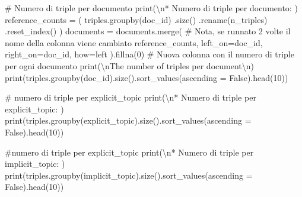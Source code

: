 \documentclass[
  italian,
  a4paper,
]{article}
\newenvironment{Shaded}{\begin{snugshade}}{\end{snugshade}}
\newcommand{\BuiltInTok}[1]{\textcolor[rgb]{0.00,0.23,0.31}{#1}}
\newcommand{\CharTok}[1]{\textcolor[rgb]{0.13,0.47,0.30}{#1}}
\newcommand{\CommentTok}[1]{\textcolor[rgb]{0.37,0.37,0.37}{#1}}
\newcommand{\DecValTok}[1]{\textcolor[rgb]{0.68,0.00,0.00}{#1}}
\newcommand{\NormalTok}[1]{\textcolor[rgb]{0.00,0.23,0.31}{#1}}
\newcommand{\OperatorTok}[1]{\textcolor[rgb]{0.37,0.37,0.37}{#1}}
\newcommand{\StringTok}[1]{\textcolor[rgb]{0.13,0.47,0.30}{#1}}
\newcommand{\VariableTok}[1]{\textcolor[rgb]{0.07,0.07,0.07}{#1}}
\begin{document}
\begin{Shaded}
\begin{Highlighting}[]
\CommentTok{\# Numero di triple per documento }
\BuiltInTok{print}\NormalTok{(}\StringTok{\textquotesingle{}}\CharTok{\textbackslash{}n}\StringTok{* Numero di triple per documento: \textquotesingle{}}\NormalTok{)}
\NormalTok{reference\_counts }\OperatorTok{=}\NormalTok{ (}
\NormalTok{    triples.groupby(}\StringTok{\textquotesingle{}doc\_id\textquotesingle{}}\NormalTok{)}
\NormalTok{      .size()}
\NormalTok{      .rename(}\StringTok{\textquotesingle{}n\_triples\textquotesingle{}}\NormalTok{)}
\NormalTok{      .reset\_index()}
\NormalTok{)}
\NormalTok{documents }\OperatorTok{=}\NormalTok{ documents.merge( }\CommentTok{\# Nota, se runnato 2 volte il nome della colonna viene cambiato}
\NormalTok{    reference\_counts,}
\NormalTok{    left\_on}\OperatorTok{=}\StringTok{\textquotesingle{}doc\_id\textquotesingle{}}\NormalTok{,}
\NormalTok{    right\_on}\OperatorTok{=}\StringTok{\textquotesingle{}doc\_id\textquotesingle{}}\NormalTok{,}
\NormalTok{    how}\OperatorTok{=}\StringTok{\textquotesingle{}left\textquotesingle{}}
\NormalTok{).fillna(}\DecValTok{0}\NormalTok{) }\CommentTok{\# Nuova colonna con il numero di triple per ogni documento}
\BuiltInTok{print}\NormalTok{(}\StringTok{\textquotesingle{}}\CharTok{\textbackslash{}n}\StringTok{The number of triples per document}\CharTok{\textbackslash{}n}\StringTok{\textquotesingle{}}\NormalTok{)}
\BuiltInTok{print}\NormalTok{(triples.groupby(}\StringTok{\textquotesingle{}doc\_id\textquotesingle{}}\NormalTok{).size().sort\_values(ascending }\OperatorTok{=} \VariableTok{False}\NormalTok{).head(}\DecValTok{10}\NormalTok{))}

\CommentTok{\# numero di triple per explicit\_topic}
\BuiltInTok{print}\NormalTok{(}\StringTok{\textquotesingle{}}\CharTok{\textbackslash{}n}\StringTok{* Numero di triple per explicit\_topic: \textquotesingle{}}\NormalTok{)}
\BuiltInTok{print}\NormalTok{(triples.groupby(}\StringTok{\textquotesingle{}explicit\_topic\textquotesingle{}}\NormalTok{).size().sort\_values(ascending }\OperatorTok{=} \VariableTok{False}\NormalTok{).head(}\DecValTok{10}\NormalTok{))}

\CommentTok{\#numero di triple per explicit\_topic}
\BuiltInTok{print}\NormalTok{(}\StringTok{\textquotesingle{}}\CharTok{\textbackslash{}n}\StringTok{* Numero di triple per implicit\_topic: \textquotesingle{}}\NormalTok{)}
\BuiltInTok{print}\NormalTok{(triples.groupby(}\StringTok{\textquotesingle{}implicit\_topic\textquotesingle{}}\NormalTok{).size().sort\_values(ascending }\OperatorTok{=} \VariableTok{False}\NormalTok{).head(}\DecValTok{10}\NormalTok{))}




\end{Highlighting}
\end{Shaded}
\end{document}
